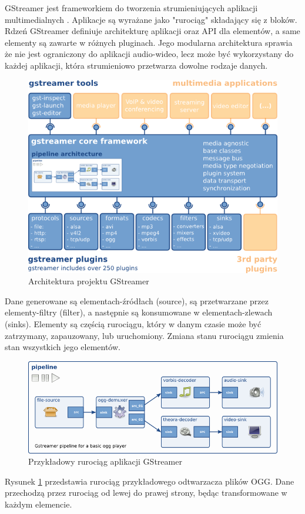 GStreamer jest frameworkiem do tworzenia strumieniujących aplikacji multimedialnych
\cite{gstreamer}. Aplikacje są wyrażane jako "rurociąg" składający się z bloków. Rdzeń GStreamer
definiuje architekturę aplikacji oraz API dla elementów, a same elementy są zawarte w różnych
pluginach. Jego modularna architektura sprawia że nie jest ograniczony do aplikacji audio-wideo,
lecz może być wykorzystany do każdej aplikacji, która strumieniowo przetwarza dowolne rodzaje
danych.

\begin{figure}[H]
    \centering
    \includegraphics[width=.5\textwidth]{img/technologie/gstreamer-overview}
    \caption{Architektura projektu GStreamer}
\end{figure}

Dane generowane są elementach-źródłach (source), są przetwarzane przez elementy-filtry (filter), a
następnie są konsumowane w elementach-zlewach (sinks). Elementy są częścią rurociągu, który w danym
czasie może być zatrzymany, zapauzowany, lub uruchomiony. Zmiana stanu rurociągu zmienia stan
wszystkich jego elementów.

\begin{figure}[H]
    \centering
    \includegraphics[width=.7\textwidth]{img/technologie/simple-player}
    \caption{Przykładowy rurociąg aplikacji GStreamer}
    \label{fig:gstreamer_example_pipeline}
\end{figure}

Rysunek \ref{fig:gstreamer_example_pipeline} przedstawia rurociąg przykładowego odtwarzacza plików
OGG. Dane przechodzą przez rurociąg od lewej do prawej strony, będąc transformowane w każdym
elemencie.

